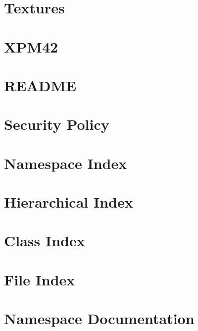\documentclass[twoside]{book}
\newcommand{\+}{\discretionary{\mbox{\scriptsize$\hookleftarrow$}}{}{}}
\begin{document}
\chapter{Textures}
\label{md__home_ssergiu_projects_cub3d_external_MLX42_docs_Textures}

\chapter{XPM42}
\label{md__home_ssergiu_projects_cub3d_external_MLX42_docs_XPM42}

\chapter{README}
\label{md__home_ssergiu_projects_cub3d_external_MLX42_README}

\chapter{Security Policy}
\label{md__home_ssergiu_projects_cub3d_external_MLX42_SECURITY}

\chapter{Namespace Index}

\chapter{Hierarchical Index}

\chapter{Class Index}

\chapter{File Index}

\chapter{Namespace Documentation}

\end{document}
